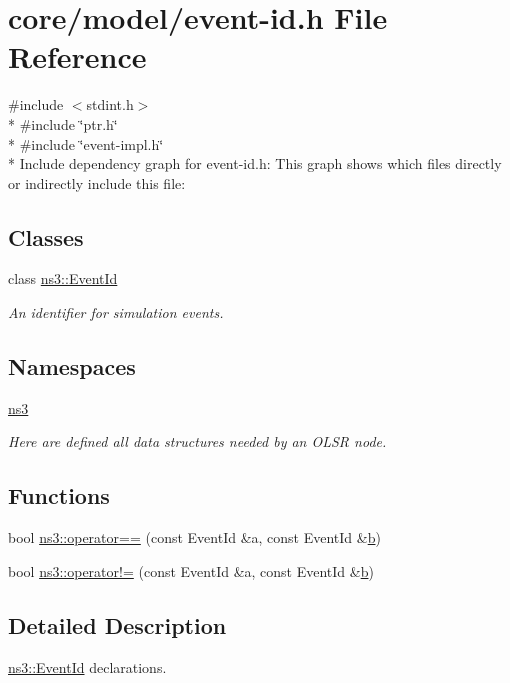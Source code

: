 \hypertarget{event-id_8h}{}\section{core/model/event-\/id.h File Reference}
\label{event-id_8h}
{\ttfamily \#include $<$stdint.\+h$>$}\\*
{\ttfamily \#include \char`\"{}ptr.\+h\char`\"{}}\\*
{\ttfamily \#include \char`\"{}event-\/impl.\+h\char`\"{}}\\*
Include dependency graph for event-\/id.h\+:
This graph shows which files directly or indirectly include this file\+:
\subsection*{Classes}
\begin{DoxyCompactItemize}
\item 
class \hyperlink{classns3_1_1EventId}{ns3\+::\+Event\+Id}
\begin{DoxyCompactList}\small\item\em An identifier for simulation events. \end{DoxyCompactList}\end{DoxyCompactItemize}
\subsection*{Namespaces}
\begin{DoxyCompactItemize}
\item 
 \hyperlink{namespacens3}{ns3}
\begin{DoxyCompactList}\small\item\em Here are defined all data structures needed by an O\+L\+SR node. \end{DoxyCompactList}\end{DoxyCompactItemize}
\subsection*{Functions}
\begin{DoxyCompactItemize}
\item 
bool \hyperlink{namespacens3_a2d3cc69eb711b3725cb61ada3cc809b7}{ns3\+::operator==} (const Event\+Id \&a, const Event\+Id \&\hyperlink{lte__pathloss_8m_a21ad0bd836b90d08f4cf640b4c298e7c}{b})
\item 
bool \hyperlink{namespacens3_a0e536270588dd9093d35cc0676afcf5d}{ns3\+::operator!=} (const Event\+Id \&a, const Event\+Id \&\hyperlink{lte__pathloss_8m_a21ad0bd836b90d08f4cf640b4c298e7c}{b})
\end{DoxyCompactItemize}


\subsection{Detailed Description}
\hyperlink{classns3_1_1EventId}{ns3\+::\+Event\+Id} declarations. 